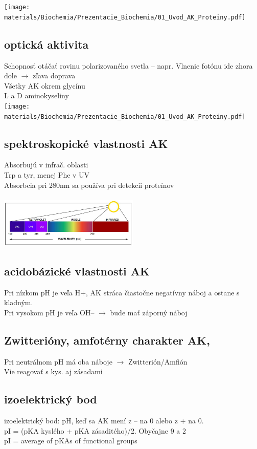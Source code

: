 \texttt{[image: materials/Biochemia/Prezentacie\_Biochemia/01\_Uvod\_AK\_Proteiny.pdf]}
\\
\subsection{optická aktivita}
Schopnosť otáčať rovinu polarizovaného svetla -- napr. Vlnenie fotónu ide zhora dole $\rightarrow$ zľava doprava\\
Všetky AK okrem glycínu\\
L a D aminokyseliny \\

\texttt{[image: materials/Biochemia/Prezentacie\_Biochemia/01\_Uvod\_AK\_Proteiny.pdf]}
\\
\subsection{spektroskopické vlastnosti AK}
Absorbujú v infrač. oblasti\\
Trp a tyr, menej Phe v UV\\
Absorbcia pri 280nm sa používa pri detekcii proteínov\\
\\
\includegraphics[width=0.5\textwidth]{images/wavelength}
\\
\subsection{acidobázické vlastnosti AK}
Pri nízkom pH je veľa H+, AK stráca čiastočne negatívny náboj a ostane s kladným. \\
Pri vysokom pH je veľa OH-- $\rightarrow$ bude mať záporný náboj\\
\subsection{Zwitterióny, amfotérny charakter AK, }
Pri neutrálnom pH má oba náboje $\rightarrow$ Zwitterión/Amfión\\
Vie reagovať s kys. aj zásadami\\
\subsection{izoelektrický bod}
izoelektrický bod: pH, keď sa AK mení z -- na 0 alebo z + na 0.\\
\tab pI = (pKA kyslého + pKA zásaditého)/2. Obyčajne 9 a 2\\
\tab pI = average of pKAs of functional groups
